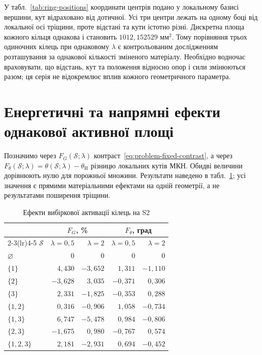 У табл.~\ref{tab:ring-positions} координати центрів подано у локальному базисі вершини, кут відраховано від дотичної. Усі три центри лежать на одному боці від локальної осі тріщини, проте відстані та кути істотно різні. Дискретна площа кожного кільця однакова і становить $1012{,}152529$ мм$^2$. Тому порівняння трьох одиночних кілець при однаковому $\lambda$ є контрольованим дослідженням розташування за однакової кількості зміненого матеріалу. Необхідно водночас враховувати, що відстань, кут та положення відносно опор і сили змінюються разом; ця серія не відокремлює вплив кожного геометричного параметра.

\section{Енергетичні та напрямні ефекти однакової активної площі}
\label{sec:ring-results}

Позначимо через $F_G(\mathcal S;\lambda)$ контраст~\eqref{eq:problem-fixed-contrast}, а через $F_\theta(\mathcal S;\lambda)=\theta(\mathcal S;\lambda)-\theta_{\mathrm H}$ різницю локальних кутів МКН. Обидві величини дорівнюють нулю для порожньої множини. Результати наведено в табл.~\ref{tab:ring-results}; усі значення є прямими матеріальними ефектами на одній геометрії, а не результатами поширення тріщини.

\begin{table}[htbp]
 \centering
 \caption{Ефекти вибіркової активації кілець на S2}
 \label{tab:ring-results}
 \begin{tabular}{lrrrr}
 \toprule
 & \multicolumn{2}{c}{$F_G$, \%} & \multicolumn{2}{c}{$F_\theta$, град}\\
 \cmidrule(lr){2-3}\cmidrule(lr){4-5}
 $\mathcal S$ & $\lambda=0{,}5$ & $\lambda=2$ & $\lambda=0{,}5$ & $\lambda=2$\\
 \midrule
 $\varnothing$ & 0 & 0 & 0 & 0\\
$\{1\}$ & $4,430$ & $-3,652$ & $1,311$ & $-1,110$ \\
$\{2\}$ & $-3,628$ & $3,035$ & $-0,371$ & $0,306$ \\
$\{3\}$ & $2,331$ & $-1,825$ & $-0,353$ & $0,288$ \\
$\{1,2\}$ & $0,316$ & $-0,906$ & $1,058$ & $-0,734$ \\
$\{1,3\}$ & $6,747$ & $-5,478$ & $0,984$ & $-0,806$ \\
$\{2,3\}$ & $-1,675$ & $0,980$ & $-0,767$ & $0,574$ \\
$\{1,2,3\}$ & $2,181$ & $-2,931$ & $0,694$ & $-0,452$ \\
 \bottomrule
 \end{tabular}
\end{table}

